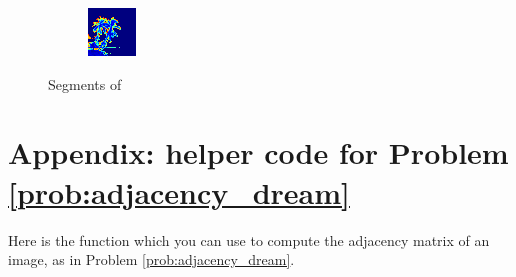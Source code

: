 \begin{figure}
\begin{subfigure}{0.31\textwidth}
    \end{subfigure}
    \hspace*{\fill}
    \begin{subfigure}{0.31\textwidth}
        \includegraphics[width=\textwidth]{PosDream.png}
    \end{subfigure}
\caption{Segments of }
\label{fig:dream_solution}
\end{figure}

\section*{Appendix: helper code for Problem \ref{prob:adjacency_dream}}
Here is the function  which you can use to compute the adjacency matrix of an image, as in Problem \ref{prob:adjacency_dream}.

